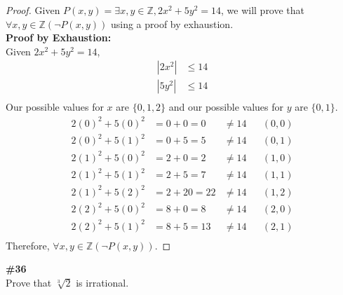 \documentclass{article}
\newcommand{\problem}[1]{\textbf{\##1}\\}
\newcommand{\AllIntegers}{\mathbb{Z}}
\begin{document}
\begin{proof}
    Given \(P(x,y) = \exists x,y \in \AllIntegers, 2x^2 + 5y^2 = 14\), we will prove that \(\forall x,y \in \AllIntegers(\neg P(x,y))\) using a proof by exhaustion.\\
    \textbf{Proof by Exhaustion:}\\
    Given \(2x^2 + 5y^2 = 14\),
    \begin{align*}
        |2x^2| &\leq 14\\
        |5y^2| &\leq 14\\
    \end{align*}
    Our possible values for \(x\) are \(\{0,1,2\}\) and our possible values for \(y\) are \(\{0,1\}\).\\
    \begin{align*}
        2(0)^2 + 5(0)^2 &= 0 + 0 = 0 &\neq 14&&(0,0)\\
        2(0)^2 + 5(1)^2 &= 0 + 5 = 5 &\neq 14&&(0,1)\\
        2(1)^2 + 5(0)^2 &= 2 + 0 = 2 &\neq 14&&(1,0)\\
        2(1)^2 + 5(1)^2 &= 2 + 5 = 7 &\neq 14&&(1,1)\\
        2(1)^2 + 5(2)^2 &= 2 + 20 = 22 &\neq 14&&(1,2)\\
        2(2)^2 + 5(0)^2 &= 8 + 0 = 8 &\neq 14&&(2,0)\\
        2(2)^2 + 5(1)^2 &= 8 + 5 = 13 &\neq 14&&(2,1)\\
    \end{align*}
    Therefore, \(\forall x,y \in \AllIntegers(\neg P(x,y))\).
\end{proof}

\pagebreak
\problem{36}
Prove that \(\sqrt[3]{2}\) is irrational.
\end{document}
